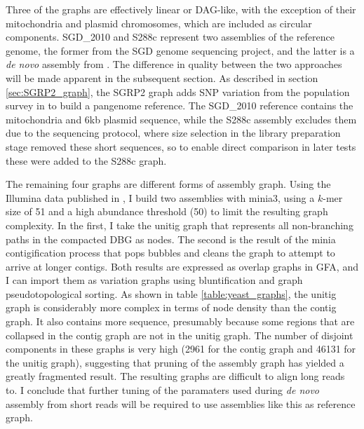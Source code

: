 Three of the graphs are effectively linear or DAG-like, with the exception of their mitochondria and plasmid chromosomes, which are included as circular components.
SGD\_2010 and S288c represent two assemblies of the reference genome, the former from the SGD genome sequencing project, and the latter is a \emph{de novo} assembly from \cite{yue2017contrasting}.
The difference in quality between the two approaches will be made apparent in the subsequent section.
As described in section \ref{sec:SGRP2_graph}, the SGRP2 graph adds SNP variation from the population survey in \cite{bergstrom2014high} to build a pangenome reference.
The SGD\_2010 reference contains the mitochondria and 6kb plasmid sequence, while the S288c assembly excludes them due to the sequencing protocol, where size selection in the library preparation stage removed these short sequences, so to enable direct comparison in later tests these were added to the S288c graph.

The remaining four graphs are different forms of assembly graph.
Using the Illumina data published in \cite{yue2017contrasting}, I build two assemblies with minia3, using a $k$-mer size of 51 and a high abundance threshold (50) to limit the resulting graph complexity.
In the first, I take the unitig graph that represents all non-branching paths in the compacted DBG as nodes.
The second is the result of the minia contigification process that pops bubbles and cleans the graph to attempt to arrive at longer contigs.
Both results are expressed as overlap graphs in GFA, and I can import them as variation graphs using bluntification and graph pseudotopological sorting.
As shown in table \ref{table:yeast_graphs}, the unitig graph is considerably more complex in terms of node density than the contig graph.
It also contains more sequence, presumably because some regions that are collapsed in the contig graph are not in the unitig graph.
The number of disjoint components in these graphs is very high (2961 for the contig graph and 46131 for the unitig graph), suggesting that pruning of the assembly graph has yielded a greatly fragmented result.
The resulting graphs are difficult to align long reads to.
I conclude that further tuning of the paramaters used during \emph{de novo} assembly from short reads will be required to use assemblies like this as reference graph.

